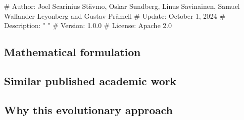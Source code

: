 # Author: Joel Scarinius Stävmo, Oskar Sundberg, Linus Savinainen, Samuel Wallander Leyonberg  and Gustav Pråmell
# Update: October 1, 2024
# Description: " "
# Version: 1.0.0
# License: Apache 2.0

\subsection{Mathematical formulation}
\subsection{Similar published academic work}
\subsection{Why this evolutionary approach}
